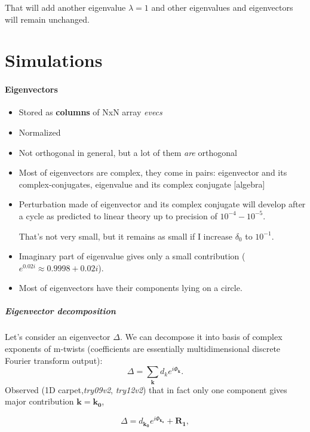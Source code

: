 \documentclass[a4paper,12pt]{article}
\renewcommand*{\vec}[1]{\mathbf{#1}}
\newcommand*{\D}{\Delta}%
\begin{document}
   That will add another eigenvalue $\lambda=1$ and other eigenvalues and eigenvectors will remain unchanged.



\clearpage
\part*{Simulations}


\subsection{Eigenvectors}

\begin{itemize}

\item Stored as \textbf{columns} of NxN array \textit{evecs}
\item Normalized
\item Not orthogonal in general, but a lot of them \emph{are} orthogonal
\item Most of eigenvectors are complex, they come in pairs: eigenvector and its complex-conjugates, eigenvalue and its complex conjugate [algebra]
\item Perturbation made of eigenvector and its complex conjugate will develop after a cycle as predicted to linear theory up to precision of $10^{-4} - 10^{ -5}$.

 That's not very small, but it remains as small if I increase $\delta_0$ to $10 ^{ -1}$.
 
\item Imaginary part of eigenvalue gives only a small contribution ($e^{0.02 i} \approx 0.9998 + 0.02 i$).
\item Most of eigenvectors have their components lying on a circle.

\end{itemize}

\subsubsection{ Eigenvector decomposition}
Let's consider an eigenvector $\D$. We can decompose it into basis of complex exponents of m-twists (coefficients are essentially multidimensional discrete Fourier transform output):
$$
\D = \sum_{\vec{k}} d_k e^{i \Phi_\vec{k}}.
$$
Observed (1D carpet,\textit{try09v2}, \textit{try12v2}) that in fact only one component gives major contribution $\vec{k}=\mathbf{k_0}$,

$$
\D = d_{\mathbf{k_0}} e^{i \Phi_\mathbf{k_0}}  + \mathbf{R_1},
$$
\end{document}
